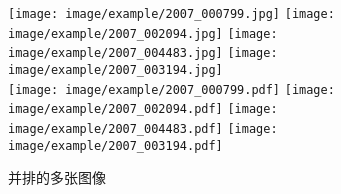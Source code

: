 \begin{figure}[h!]%
	\centering
	\texttt{[image: image/example/2007\_000799.jpg]}
	\texttt{[image: image/example/2007\_002094.jpg]}
	\texttt{[image: image/example/2007\_004483.jpg]}
	\texttt{[image: image/example/2007\_003194.jpg]}
	\\
	\texttt{[image: image/example/2007\_000799.pdf]}
	\texttt{[image: image/example/2007\_002094.pdf]}
	\texttt{[image: image/example/2007\_004483.pdf]}
	\texttt{[image: image/example/2007\_003194.pdf]}
	\caption{并排的多张图像}
	\label{fig:example1}
\end{figure}
\endinput
